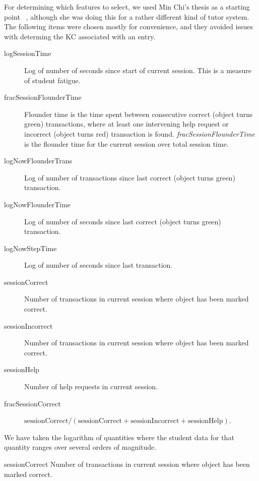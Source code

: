 \documentclass[11pt,letterpaper]{article}
\begin{document}
For determining which features to select, we used Min Chi's thesis
as a starting point ~\cite{mint}, although she was doing this for a
rather different kind of tutor system.  The following items were
chosen mostly for convenience, and they avoided issues with determing
the KC associated with an entry.
%
\begin{description}

\item[logSessionTime] Log of number of seconds since start of current
  session.  This is a measure of student fatigue.

\item[fracSessionFlounderTime] Flounder time is the time spent between 
consecutive correct (object turns green) transactions, where at least
one intervening help request or incorrect (object turns red)
transaction is found.  {\em fracSessionFlounderTime} is the flounder
time for the current session over total session time.

\item[logNowFlounderTrans] Log of number of transactions since last
  correct (object turns green) transaction.

\item[logNowFlounderTime] Log of number of seconds since last
  correct (object turns green) transaction.

\item[logNowStepTime] Log of number of seconds since last transaction.

\item[sessionCorrect] Number of transactions in current session where 
   object has been marked  correct.

\item[sessionIncorrect] Number of transactions in current session where 
   object has been marked  correct.

\item[sessionHelp] Number of help requests in current session.

\item[fracSessionCorrect] $\mbox{sessionCorrect}/\left(\mbox{sessionCorrect}+\mbox{sessionIncorrect}+\mbox{sessionHelp}\right)$.


\end{description}
%
We have taken the logarithm of quantities where the student data
for that quantity ranges over several orders of magnitude.

\item[sessionCorrect] Number of transactions in current session where 
   object has been marked  correct.
\end{document}
